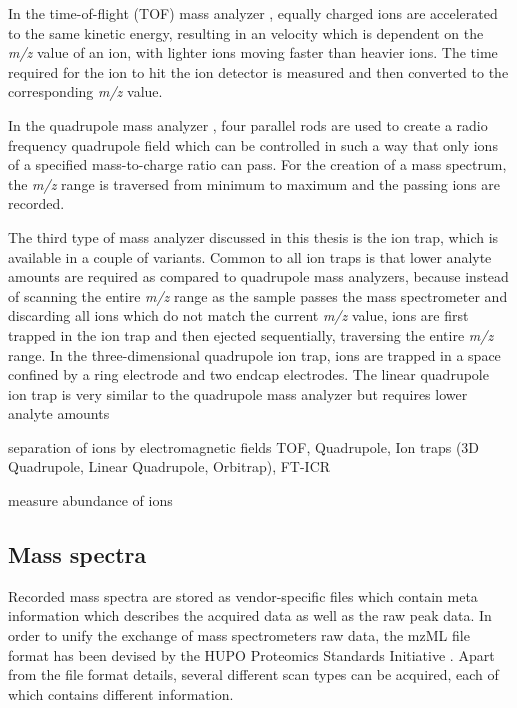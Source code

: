 In the time-of-flight (TOF) mass analyzer \citep{Wolff1953}, equally charged 
ions are accelerated to the same kinetic energy, resulting in an velocity 
which is dependent on the {\em m/z} value of an ion, with lighter ions
moving faster than heavier ions.
The time required for the ion to hit the ion detector is measured and
then converted to the corresponding {\em m/z} value.

In the quadrupole mass analyzer \citep{Paul1956}, four parallel rods are 
used to create a radio frequency quadrupole field which can be controlled
in such a way that only ions of a specified mass-to-charge ratio can pass.
For the creation of a mass spectrum, the {\em m/z} range is traversed from
minimum to maximum and the passing ions are recorded.

The third type of mass analyzer discussed in this thesis is the ion trap,
which is available in a couple of variants.
Common to all ion traps is that lower analyte amounts are required as
compared to quadrupole mass analyzers, because instead of scanning
the entire {\em m/z} range as the sample passes the mass spectrometer 
and discarding all ions which do not match the current {\em m/z} value, 
ions are first trapped in the ion trap and then ejected sequentially, 
traversing the entire {\em m/z} range.
In the three-dimensional quadrupole ion trap, ions are trapped in a space
confined by a ring electrode and two endcap electrodes.
The linear quadrupole ion trap is very similar to the quadrupole
mass analyzer but requires lower analyte amounts 



\begin{todo}
separation of ions by electromagnetic fields
TOF, Quadrupole, Ion traps (3D Quadrupole, Linear Quadrupole, Orbitrap), FT-ICR
\end{todo}

\begin{todo}
measure abundance of ions
\end{todo}

\subsection{Mass spectra}

Recorded mass spectra are stored as vendor-specific files which contain meta 
information which describes the acquired data as well as the raw peak data.
In order to unify the exchange of mass spectrometers raw data, the mzML file 
format has been devised by the HUPO Proteomics Standards Initiative
\citep{Deutsch2008}.
Apart from the file format details, several different scan types can be
acquired, each of which contains different information.

